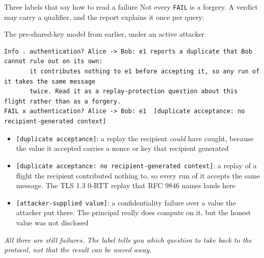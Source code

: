 \ifdefined\PRESENTATION\else\PassOptionsToClass{handout}{beamer}\fi\documentclass[aspectratio=169, lualatex]{beamer}
\newcommand{\vpcode}{\fontsize{6}{6.4}\selectfont\ttfamily\color{vpink}}
\begin{document}
\begin{frame}[fragile]{Three labels that say how to read a failure}
	\footnotesize
	Not every \texttt{FAIL} is a forgery. A verdict may carry a qualifier, and the report explains it once per query:
	\vspace{0.2em}
	\begin{vpresult}[top=0.5mm, bottom=0.5mm]{The pre-shared-key model from earlier, under an active attacker}
		\begin{lstlisting}[basicstyle=\vpcode]
Info . authentication? Alice -> Bob: e1 reports a duplicate that Bob cannot rule out on its own:
       it contributes nothing to e1 before accepting it, so any run of it takes the same message
       twice. Read it as a replay-protection question about this flight rather than as a forgery.
FAIL x authentication? Alice -> Bob: e1  [duplicate acceptance: no recipient-generated context]
\end{lstlisting}
	\end{vpresult}
	\vspace{0.3em}
	\begin{itemize}
		\item \texttt{[duplicate acceptance]}: a replay the recipient \textit{could} have caught, because the value it accepted carries a nonce or key that recipient generated
		\item \texttt{[duplicate acceptance: no recipient-generated context]}: a replay of a flight the recipient contributed nothing to, so every run of it accepts the same message. The TLS 1.3 0-RTT replay that RFC 9846 names lands here
		\item \texttt{[attacker-supplied value]}: a confidentiality failure over a value the attacker put there. The principal really does compute on it, but the honest value was not disclosed
	\end{itemize}
	\vspace{0.2em}
	\begin{center}
		\small \textit{All three are still failures. The label tells you which question to take back to the protocol, not that the result can be waved away.}
	\end{center}
\end{frame}
\end{document}
